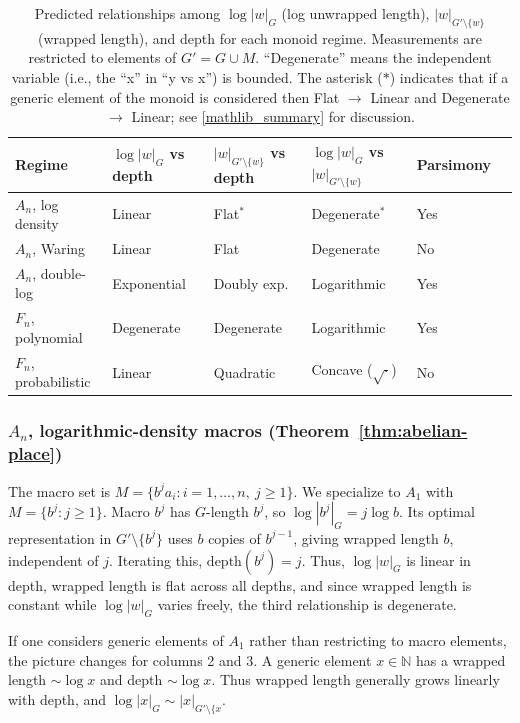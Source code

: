 \documentclass[12pt]{amsart}
\theoremstyle{definition}
\theoremstyle{remark}
\begin{document}
\begin{table}[ht]
\centering
\small
\begin{tabular}{lllllc}
\hline
Regime & $\log|w|_G$ vs depth & $|w|_{G' \setminus \{w\}}$ vs depth & $\log|w|_G$ vs $|w|_{G' \setminus \{w\}}$ & Parsimony \\
\hline
$A_n$, log density & Linear & Flat$^\ast$ & Degenerate$^\ast$ & Yes \\
$A_n$, Waring & Linear & Flat & Degenerate & No \\
$A_n$, double-log & Exponential & Doubly exp. & Logarithmic & Yes \\
$F_n$, polynomial & Degenerate & Degenerate & Logarithmic & Yes \\
$F_n$, probabilistic & Linear & Quadratic & Concave ($\sqrt{\cdot}$) & No \\
\hline
\end{tabular}
\caption{Predicted relationships among $\log|w|_G$ (log unwrapped length), $|w|_{G' \setminus \{w\}}$ (wrapped length), and depth for each monoid regime. 
Measurements are restricted to elements of 
$G'= G \cup M$. 
``Degenerate'' means the independent variable (i.e., the ``x'' in ``y vs x'') is bounded.
The asterisk ($\ast$) indicates that if a generic element of the monoid is considered then Flat $\rightarrow$ Linear and Degenerate $\rightarrow$ Linear; see \ref{mathlib_summary} for discussion.}
\label{tab:regime-predictions}
\end{table}

\subsubsection{$A_n$, logarithmic-density macros (Theorem~\ref{thm:abelian-place})}
The macro set is $M = \{b^j a_i : i = 1, \ldots, n,\ j \geq 1\}$.
We specialize to $A_1$ with $M = \{b^j : j \geq 1\}$.
Macro $b^j$ has $G$-length $b^j$, so $\log|b^j|_G = j \log b$.
Its optimal representation in $G' \setminus \{b^j\}$ uses $b$ copies of $b^{j-1}$, giving wrapped length $b$, independent of $j$.
Iterating this, $\mathrm{depth}(b^j) = j$.
Thus, $\log|w|_G$ is linear in depth, wrapped length is flat across all depths, and since wrapped length is constant while $\log|w|_G$ varies freely, the third relationship is degenerate.

If one considers generic elements of $A_1$ rather than restricting to macro elements, the picture changes for columns 2 and 3. 
A generic element $x \in \mathbb{N}$ has a wrapped length $\sim \log x$ and depth $\sim \log x$. 
Thus wrapped length generally grows 
linearly with depth, and $\log|x|_G \sim |x|_{G' \setminus \{x}$. 
\end{document}
